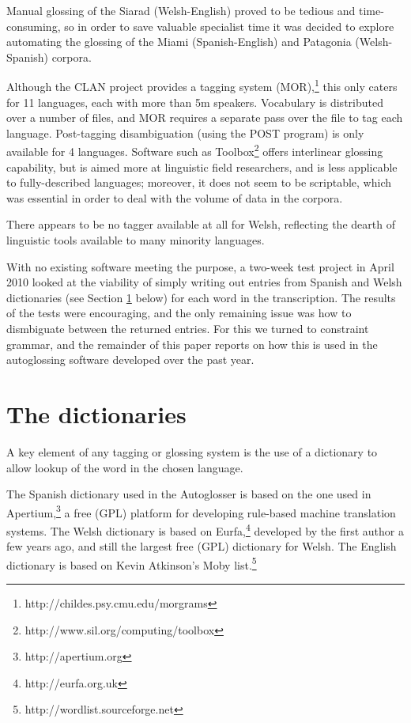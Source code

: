 \documentclass[11pt]{article}
\begin{document}
Manual glossing of the Siarad (Welsh-English) proved to be tedious and time-consuming, so in order to save valuable specialist time it was decided to explore automating the glossing of the Miami (Spanish-English) and Patagonia (Welsh-Spanish) corpora.

Although the CLAN project provides a tagging system (MOR),\footnote{http://childes.psy.cmu.edu/morgrams} this only caters for 11 languages, each with more than 5m speakers.  Vocabulary is distributed over a number of files, and MOR requires a separate pass over the file to tag each language.  Post-tagging disambiguation (using the POST program) is only available for 4 languages.  Software such as Toolbox\footnote{http://www.sil.org/computing/toolbox} offers interlinear glossing capability, but is aimed more at linguistic field researchers, and is less applicable to fully-described languages; moreover, it does not seem to be scriptable, which was essential in order to deal with the volume of data in the corpora.

There appears to be no tagger available at all for Welsh, reflecting the dearth of linguistic tools available to many minority languages.

With no existing software meeting the purpose, a two-week test project in April 2010 looked at the viability of simply writing out entries from Spanish and Welsh dictionaries (see Section \ref{sec:dictionaries} below) for each word in the transcription.  The results of the tests were encouraging, and the only remaining issue was how to dismbiguate between the returned entries.  For this we turned to constraint grammar, and the remainder of this paper reports on how this is used in the autoglossing software developed over the past year.


\section{The dictionaries}
\label{sec:dictionaries}

A key element of any tagging or glossing system is the use of a dictionary to allow lookup of the word in the chosen language.
  
The Spanish dictionary used in the Autoglosser is based on the one used in Apertium,\footnote{http://apertium.org} a free (GPL) platform for developing rule-based machine translation systems.  The Welsh dictionary is based on Eurfa,\footnote{http://eurfa.org.uk} developed by the first author a few years ago, and still the largest free (GPL) dictionary for Welsh.  The English dictionary is based on Kevin Atkinson's Moby list.\footnote{http://wordlist.sourceforge.net}
\end{document}
